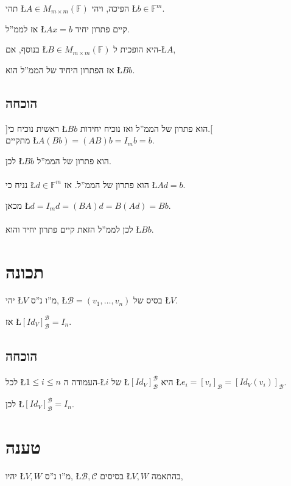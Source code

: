 \documentclass[english,hebrew]{article}
\begin{document}
תהי \L{$A\in M_{m\times m}(\mathbb{F})$} הפיכה, ויהי \L{$b\in\mathbb{F}^{m}$}.

אז לממ\textquotedblright ל \L{$Ax=b$} קיים פתרון יחיד.

בנוסף, אם \L{$B\in M_{m\times m}(\mathbb{F})$} היא הופכית ל-\L{$A$},

אז הפתרון היחיד של הממ\textquotedblright ל הוא \L{$Bb$}.

\subsection{הוכחה}

{]}ראשית נוכיח כי \L{$Bb$} הוא פתרון של הממ\textquotedblright ל ואז
נוכיח יחידות.{[}\\

מתקיים \L{$A(Bb)=(AB)b=I_{m}b=b$}.

לכן \L{$Bb$} הוא פתרון של הממ\textquotedblright ל.\\
\\
נניח כי \L{$d\in\mathbb{F}^{m}$} הוא פתרון של הממ\textquotedblright ל.
אז \L{$Ad=b$}.

מכאן \L{$d=I_{m}d=(BA)d=B(Ad)=Bb$}.\\
\\
לכן לממ\textquotedblright ל הזאת קיים פתרון יחיד והוא \L{$Bb$}.

\section{תכונה}

יהי \L{$V$} מ\textquotedblright ו נ\textquotedblright ס, \L{$\mathcal{B}=(v_{1},\dots,v_{n})$}
בסיס של \L{$V$}.

אז \L{$[Id_{V}]_{\mathcal{B}}^{\mathcal{B}}=I_{n}$}.

\subsection{הוכחה}

לכל \L{$1\leq i\leq n$} העמודה ה-\L{$i$} של \L{$[Id_{V}]_{\mathcal{B}}^{\mathcal{B}}$}
היא \L{$e_{i}=[v_{i}]_{\mathcal{B}}=[Id_{V}(v_{i})]_{\mathcal{B}}$}.

לכן \L{$[Id_{V}]_{\mathcal{B}}^{\mathcal{B}}=I_{n}$}.

\section{טענה}

יהיו \L{$V,W$} מ\textquotedblright ו נ\textquotedblright ס, \L{$\mathcal{B},\mathcal{C}$}
בסיסים \L{$V,W$} בהתאמה,
\end{document}
